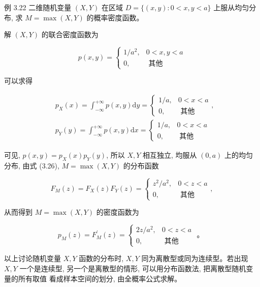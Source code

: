 \documentclass{beamer}
\begin{document}
	\begin{frame}
		例 3.22 二维随机变量 $(X, Y)$ 在区域 $D=\{(x, y): 0<x, y<a\}$ 上服从均匀分布, 求 $M=\max (X, Y)$ 的概率密度函数。
	\end{frame}
	
	\begin{frame}
		解 $(X, Y)$ 的联合密度函数为
		
		$$
		p(x, y)=\left\{\begin{array}{cc}
			1 / a^{2}, & 0<x, y<a \\
			0, & \text { 其他 }
		\end{array}\right.
		$$
		
		可以求得
		
		$$
		\begin{aligned}
			& p_{X}(x)=\int_{-\infty}^{+\infty} p(x, y) \mathrm{d} y=\left\{\begin{array}{cc}
				1 / a, & 0<x<a \\
				0, & \text { 其他 }
			\end{array},\right. \\
			& p_{Y}(y)=\int_{-\infty}^{+\infty} p(x, y) \mathrm{d} x=\left\{\begin{array}{cc}
				1 / a, & 0<x<a \\
				0, & \text { 其他 }
			\end{array}\right.
		\end{aligned}
		$$
		
		可见, $p(x, y)=p_{X}(x) p_{Y}(y)$, 所以 $X, Y$ 相互独立, 均服从 $(0, a)$ 上的均匀分布, 由式 (3.26), $M=\max (X, Y)$ 的分布函数
		
		$$
		F_{M}(z)=F_{X}(z) F_{Y}(z)=\left\{\begin{array}{cc}
			z^{2} / a^{2}, & 0<z<a \\
			0, & \text { 其他 }
		\end{array},\right.
		$$
		
		
	\end{frame}
	
	\begin{frame}
		从而得到 $M=\max (X, Y)$ 的密度函数为
		
		$$
		p_{M}(z)=F_{M}^{\prime}(z)=\left\{\begin{array}{cc}
			2 z / a^{2}, & 0<z<a \\
			0, & \text { 其他 }
		\end{array}\right. \text { 。 }
		$$
		
		以上讨论随机变量 $X, Y$ 函数的分布时, $X, Y$ 同为离散型或同为连续型。若出现 $X, Y$ 一个是连续型, 另一个是离散型的情形, 可以用分布函数法, 把离散型随机变量的所有取值 看成样本空间的划分, 由全概率公式求解。
	\end{frame}
	
\end{document}
